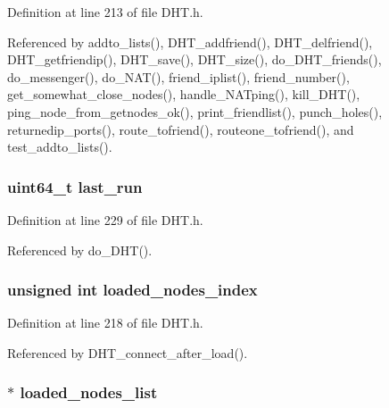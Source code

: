 Definition at line 213 of file D\+H\+T.\+h.



Referenced by addto\+\_\+lists(), D\+H\+T\+\_\+addfriend(), D\+H\+T\+\_\+delfriend(), D\+H\+T\+\_\+getfriendip(), D\+H\+T\+\_\+save(), D\+H\+T\+\_\+size(), do\+\_\+\+D\+H\+T\+\_\+friends(), do\+\_\+messenger(), do\+\_\+\+N\+A\+T(), friend\+\_\+iplist(), friend\+\_\+number(), get\+\_\+somewhat\+\_\+close\+\_\+nodes(), handle\+\_\+\+N\+A\+Tping(), kill\+\_\+\+D\+H\+T(), ping\+\_\+node\+\_\+from\+\_\+getnodes\+\_\+ok(), print\+\_\+friendlist(), punch\+\_\+holes(), returnedip\+\_\+ports(), route\+\_\+tofriend(), routeone\+\_\+tofriend(), and test\+\_\+addto\+\_\+lists().

\hypertarget{struct_d_h_t_a73e8197b772061572cb931a378ade3e4}{
\subsubsection[{last\+\_\+run}]{\setlength{\rightskip}{0pt plus 5cm}uint64\+\_\+t last\+\_\+run}}\label{struct_d_h_t_a73e8197b772061572cb931a378ade3e4}


Definition at line 229 of file D\+H\+T.\+h.



Referenced by do\+\_\+\+D\+H\+T().

\hypertarget{struct_d_h_t_a6525da58097b462adbe2ad9000a6d77d}{
\subsubsection[{loaded\+\_\+nodes\+\_\+index}]{\setlength{\rightskip}{0pt plus 5cm}unsigned int loaded\+\_\+nodes\+\_\+index}}\label{struct_d_h_t_a6525da58097b462adbe2ad9000a6d77d}


Definition at line 218 of file D\+H\+T.\+h.



Referenced by D\+H\+T\+\_\+connect\+\_\+after\+\_\+load().

\hypertarget{struct_d_h_t_a3050c21873637c51d8001c807f62fa74}{
\subsubsection[{loaded\+\_\+nodes\+\_\+list}]{$\ast$ loaded\+\_\+nodes\+\_\+list}}\label{struct_d_h_t_a3050c21873637c51d8001c807f62fa74}


